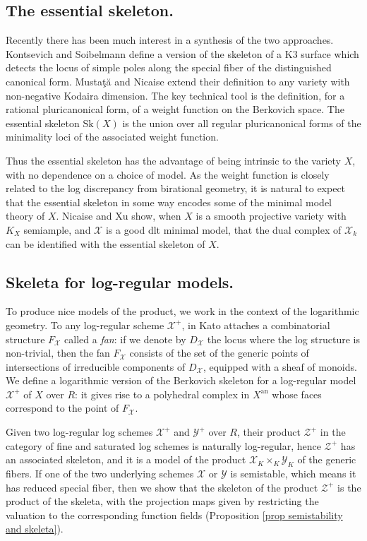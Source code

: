 \documentclass{amsart}%
\numberwithin{equation}{subsection}
\theoremstyle{plain2}
\theoremstyle{definition2}
\theoremstyle{stepstyle}
\theoremstyle{point}
\theoremstyle{subpoint}
\newcommand{\cX}{\ensuremath{\mathscr{X}}}
\newcommand{\cY}{\ensuremath{\mathscr{Y}}}
\newcommand{\cZ}{\ensuremath{\mathscr{Z}}}
\renewcommand{\cY}{\ensuremath{\mathscr{Y}}}
\newcommand{\an}{\mathrm{an}}
\newcommand{\Sk}{\mathrm{Sk}}
\begin{document}
\subsection{The essential skeleton.} Recently there has been much interest in a synthesis of the two approaches. Kontsevich and Soibelmann \cite{KontsevichSoibelman} define a version of the skeleton of a K3 surface which detects the locus of simple poles along the special fiber of the distinguished canonical form. Musta{\c{t}}{\u{a}} and Nicaise \cite{MustataNicaise} extend their definition to any variety with non-negative Kodaira dimension. The key technical tool is the definition, for a rational pluricanonical form, of a weight function on the Berkovich space. The essential skeleton $\Sk(X)$ is the union over all regular pluricanonical forms of the minimality loci of the associated weight function.

Thus the essential skeleton has the advantage of being intrinsic to the variety $X$, with no dependence on a choice of model. As the weight function is closely related to the log discrepancy from birational geometry, it is natural to expect that the essential skeleton in some way encodes some of the minimal model theory of $X$. Nicaise and Xu \cite{NicaiseXu} show, when $X$ is a smooth projective variety with $K_X$ semiample, and $\cX$ is a good dlt minimal model, that the dual complex of $\cX_k$ can be identified with the essential skeleton of $X$.

\subsection{Skeleta for log-regular models.} To produce nice models of the product, we work in the context of the logarithmic geometry. To any log-regular scheme $\cX^+$, in \cite{Kato1994a} Kato attaches a combinatorial structure $F_\cX$ called a \emph{fan}: if we denote by $D_\cX$ the locus where the log structure is non-trivial, then the fan $F_\cX$ consists of the set of the generic points of intersections of irreducible components of $D_\cX$, equipped with a sheaf of monoids. We define a logarithmic version of the Berkovich skeleton for a log-regular model $\cX^+$ of $X$ over $R$: it gives rise to a polyhedral complex in $X^\an$ whose faces correspond to the point of $F_\cX$.

Given two log-regular log schemes $\cX^+$ and $\cY^+$ over $R$, their product $\cZ^+$ in the category of fine and saturated log schemes is naturally log-regular, hence $\cZ^+$ has an associated skeleton, and it is a model of the product $\cX_K \times_K \cY_K$ of the generic fibers. If one of the two underlying schemes $\cX$ or $\cY$ is semistable, which means it has reduced special fiber, then we show that the skeleton of the product $\cZ^+$ is the product of the skeleta, with the projection maps given by restricting the valuation to the corresponding function fields (Proposition \ref{prop semistability and skeleta}).
\end{document}
